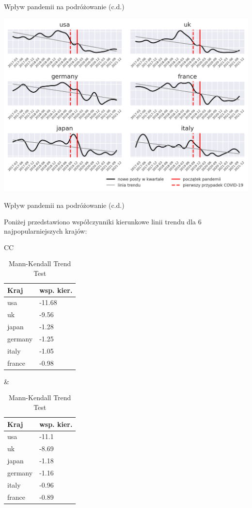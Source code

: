 \documentclass[./main.tex]{subfiles}
\begin{document}
\begin{frame}{Wpływ pandemii na podróżowanie (c.d.)}
\begin{center}
    \includegraphics[width=\textwidth]{travel/countries.png}
\end{center}
\end{frame}

\begin{frame}{Wpływ pandemii na podróżowanie (c.d.)}

Poniżej przedstawiono współczynniki kierunkowe linii trendu dla 6 najpopularniejszych krajów: 

\begin{center}
    \begin{table}[htb]
    \begin{tabularx}{\linewidth}{CC}
    \begin{tabular}{|l|l|}
    \hline
    \textbf{Kraj}    & \textbf{wsp. kier.}     \\ \hline
    usa     & -11.68 \\ \hline
    uk      & -9.56  \\ \hline
    japan   & -1.28  \\ \hline
    germany & -1.25  \\ \hline
    italy   & -1.05  \\ \hline
    france  & -0.98  \\ \hline
    \end{tabular} 
    \caption*{Metoda regresji liniowej}
    &
    \begin{tabular}{|l|l|}
    \hline
    \textbf{Kraj}    & \textbf{wsp. kier.} \\ \hline
    usa     & -11.1 \\ \hline
    uk      & -8.69 \\ \hline
    japan   & -1.18 \\ \hline
    germany & -1.16 \\ \hline
    italy   & -0.96 \\ \hline
    france  & -0.89 \\ \hline
    \end{tabular}
    \caption*{Mann-Kendall Trend Test}
    \end{tabularx}
    \end{table}
\end{center}
\end{frame}
\end{document}
